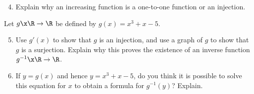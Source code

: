 \begin{activity}
\begin{enumerate} \setcounter{enumi}{3}
\item Explain why an increasing function is a one-to-one function or an injection.
\end{enumerate}

\noindent
Let  $g\x \R \to \R$ be defined by  $g( x ) = x^3  + x - 5$.

\enlargethispage{\baselineskip}
\begin{enumerate}
\setcounter{enumi}{4}
\item Use  $g'( x )$ to show that $g$ is an injection, and use a graph of  $g$  to show that  $g$  is a surjection.  Explain why this proves the existence of an inverse function  
$g^{ - 1} \x \R \to \R$.

\item If  $y = g( x )$ and hence $y = x^3  + x - 5$, do you think it is possible to solve this equation for  $x$  to obtain a formula for  $g^{ - 1} ( y )$?  Explain.
\end{enumerate}
\end{activity}
\hbreak
%
